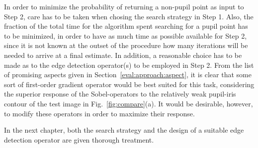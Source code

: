 In order to minimize the probability of returning a non-pupil point as
input to Step 2, care has to be taken when chosing the search strategy
in Step 1.  Also, the fraction of the total time for the algorithm
spent searching for a pupil point has to be minimized, in order to
have as much time as possible available for Step 2, since it is not
known at the outset of the procedure how many iterations will be
needed to arrive at a final estimate.  In addition, a reasonable
choice has to be made as to the edge detection operator(s) to be
employed in Step 2.  From the list of promising aspects given in
Section~\ref{eval:approach:aspect}, it is clear that some sort of
first-order gradient operator would be best suited for this task,
considering the superior response of the Sobel-operators to the
relatively weak pupil-iris contour of the test image in
Fig.~\ref{fig:compare}(a).  It would be desirable, however, to modify
these operators in order to maximize their response.

In the next chapter, both the search strategy and the design of a
suitable edge detection operator are given thorough treatment.
